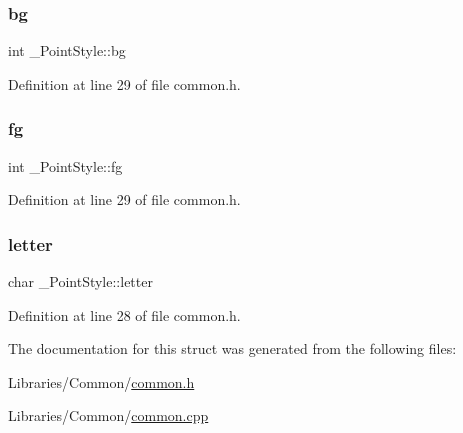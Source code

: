 \subsubsection{\texorpdfstring{bg}{bg}}
{\footnotesize\ttfamily int \+\_\+\+Point\+Style\+::bg}



Definition at line 29 of file common.\+h.

\mbox{\label{struct___point_style_aad357bccd6e6759fc8575d3354d2bc7b}} 
\subsubsection{\texorpdfstring{fg}{fg}}
{\footnotesize\ttfamily int \+\_\+\+Point\+Style\+::fg}



Definition at line 29 of file common.\+h.

\mbox{\label{struct___point_style_aa4cf23b21f61b08b05ff90b37fb26bc8}} 
\subsubsection{\texorpdfstring{letter}{letter}}
{\footnotesize\ttfamily char \+\_\+\+Point\+Style\+::letter}



Definition at line 28 of file common.\+h.



The documentation for this struct was generated from the following files\+:\begin{DoxyCompactItemize}
\item 
Libraries/\+Common/\mbox{\hyperlink{common_8h}{common.\+h}}\item 
Libraries/\+Common/\mbox{\hyperlink{common_8cpp}{common.\+cpp}}\end{DoxyCompactItemize}
